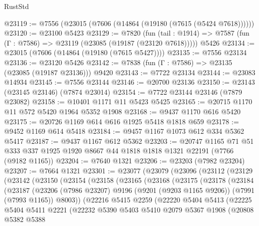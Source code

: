 \begin{lexlean}{RustStd}
\begin{coremodule}
@23119 := @7556 (@23015 (@7606 (@14864 (@19180 (@7615 (@5424 @7618))))))
@23120 := @23100 @5423
@23129 := @7820
    (fun (tail : @1914) => @7587 (fun (Γ : @7586) => @23119 (@23085 (@19187 (@23120 @7618)))))
    @5426
@23134 := @23015 (@7606 (@14864 (@19180 (@7615 @5427))))
@23135 := @7556 @23134
@23136 := @23120 @5426
@23142 := @7838 (fun (Γ : @7586) => @23135 (@23085 (@19187 @23136))) @9420
@23143 := @7722 @23134
@23144 := @23083 @14934
@23145 := @7556 @23144
@23146 := @20700 @23136
@23150 := @23143 (@23145 @23146) (@7874 @23014)
@23154 := @7722 @23144 @23146 (@7879 @23082)
@23158 := @10401 @1171 @11 @5423 @5425
@23165 := @20715 @1170 @11 @572 @5420 @1964 @5352 @1908
@23168 := @9437 @1170 @616 @5420
@23175 := @20726 @1169 @614 @616 @1925 @5418 @1818 @659
@23178 := @9452 @1169 @614 @5418
@23184 := @9457 @1167 @1073 @612 @334 @5362 @5417
@23187 := @9437 @1167 @612 @5362
@23203 := @20747
    @1165
    @71
    @51
    @333
    @337
    @1925
    @1920
    @8667
    @44
    @1818
    @1818
    @1321
    @22191
    (@7766 (@9182 @1165))
@23204 := @7640 @1321
@23206 := @23203 (@7982 @23204)
@23207 := @7664 @1321
@23301 := @23077
    (@23079
      (@23096
        (@23112
          (@23129
            (@23142
              (@23150
                (@23154
                  (@23158
                    (@23165
                      (@23168
                        (@23175
                          (@23178
                            (@23184
                              (@23187
                                (@23206
                                  (@7986 @23207)
                                  @9196
                                  (@9201 (@9203 @1165 @9206))
                                  (@7991 (@7993 @1165))
                                  @8003))
                              (@22216
                                @5415
                                @2259
                                (@22220
                                  @5404
                                  @5413
                                  (@22225
                                    @5404
                                    @5411
                                    @2221
                                    (@22232
                                      @5390
                                      @5403
                                      @5410
                                      @2079
                                      @5367
                                      @1908
                                      (@20808
                                        @5382
                                        @5388

\end{coremodule}
\end{lexlean}
